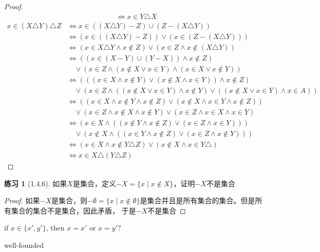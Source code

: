 \documentclass[11pt]{article}
\theoremstyle{definition}
\newtheorem{exercise}{练习}
\begin{document}
\begin{proof}
\begin{align*}
&\Leftrightarrow x\in Y\triangle X
\end{align*}
\begin{align*}
x\in(X\triangle Y)\triangle Z&\Leftrightarrow x\in((X\triangle Y)-Z)\cup(Z-(X\triangle Y))\\
&\Leftrightarrow (x\in ((X\triangle Y)-Z))\vee(x\in(Z-(X\triangle Y)))\\
&\Leftrightarrow (x\in X\triangle Y\wedge x\notin Z)\vee(x\in Z\wedge x\notin(X\triangle Y))\\
&\Leftrightarrow ((x\in (X-Y)\cup(Y-X))\wedge x\notin Z)\\&\quad\vee(x\in Z\wedge (x\notin X\vee x\in Y)\wedge(x\in X\vee x\notin Y))\\
&\Leftrightarrow (((x\in X\wedge x\notin Y)\vee(x\notin X\wedge x\in Y))\wedge x\notin Z)\\&\quad\vee
(x\in Z\wedge ((x\notin X\vee x\in Y)\wedge x\notin Y)\vee((x\notin X\vee x\in Y)\wedge x\in A))\\
&\Leftrightarrow ((x\in X\wedge x\notin Y\wedge x\notin Z)\vee(x\notin X\wedge x\in Y\wedge x\notin Z))\\&\quad\vee(x\in Z\wedge x\notin X\wedge x\notin Y)\vee(x\in Z\wedge x\in X\wedge x\in Y)\\
&\Leftrightarrow (x\in X\wedge((x\notin Y\wedge x\notin Z)\vee(x\in Z\wedge x\in Y)))\\&\quad\vee(x\notin X\wedge((x\in Y\wedge x\notin Z)\vee(x\in Z\wedge x\notin Y)))\\
&\Leftrightarrow (x\in X\wedge x\notin Y\triangle Z)\vee(x\notin X\wedge x\in Y\triangle)\\
&\Leftrightarrow x\in X\triangle(Y\triangle Z)
\end{align*}
\end{proof}

\begin{exercise}[1.4.6]
如果\(X\)是集合，定义\(-X=\{x\mid x\notin X\}\)，证明\(-X\)不是集合
\end{exercise}

\begin{proof}
如果\(-X\)是集合，则\(-\emptyset=\{x\mid x\notin\emptyset\}\)是集合并且是所有集合的集合。但是所有集合的集合不是集合，因此矛盾，
于是\(-X\)不是集合
\end{proof}


if \(x\in\{x',y'\}\), then \(x=x'\) or \(x=y'\)?

well-founded
\end{document}
